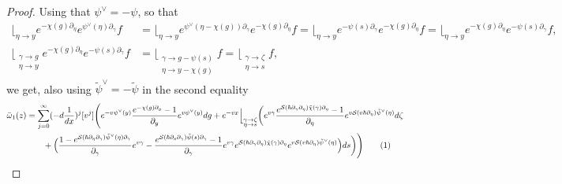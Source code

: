 \documentclass[10pt,a4paper,oneside,no-math,reqno]{amsart}%
\theoremstyle{plain}
\theoremstyle{definition}
\theoremstyle{remark}
\numberwithin{equation}{section}
\newcommand{\mc}[1]{\mathcal{#1}}
\newcommand{\1}{\mathds{1}}
\newcommand{\<}{\langle}
\renewcommand{\>}{\rangle}
\newcommand{\del}{\partial}
\begin{document}
\begin{proof}
	Using that $ \psi^\vee = -\psi$, so that
	\begin{align*}
		\Big\lfloor_{\eta \to y} e^{-\chi(g) \del_\eta} e^{ \psi^\vee (\eta) \del_\gamma} f
		&=
		\Big\lfloor_{\eta \to y} e^{\psi^\vee (\eta- \chi(g)) \del_\gamma} e^{-\chi(g)\del_\eta} f
		=
		\Big\lfloor_{\eta \to y} e^{- \psi (s) \del_\gamma} e^{-\chi(g)\del_\eta} f
		=
		\Big\lfloor_{\eta \to y} e^{-\chi(g)\del_\eta} e^{- \psi (s) \del_\gamma} f,
		\\
		\Big\lfloor_{\substack{\gamma \to g\\ \eta \to y}} e^{-\chi(g)\del_\eta} e^{- \psi (s) \del_\gamma} f
		&=
		\Big\lfloor_{\substack{\gamma \to g - \psi(s) \\ \eta \to y - \chi(g)}} f
		=
		\Big\lfloor_{\substack{\gamma \to \zeta \\ \eta \to s}} f,
	\end{align*}
	we get, also using $ \tilde{\psi}^\vee = - \tilde{\psi}$ in the second equality
	\begin{align*}
		\bar{\omega}_1 (z)
        &=
        \sum_{j=0}^\infty (-d \frac{1}{dx})^j [v^j ] 
		\Bigg( 
        e^{-v \psi^\vee (y)}  \frac{e^{-\chi (g) \del_y} - 1}{\del_y} e^{v \psi^\vee (y )} dg 
        + 
        e^{-vx}
        \Big\lfloor_{\substack{\gamma \to \zeta \\ \eta \to s}} \bigg( 
        e^{v\gamma} \frac{e^{ \mc{S}( \hbar \del_\gamma \del_\eta) \tilde{\chi} (\gamma) \del_\eta} - 1}{\del_\eta} e^{v \mc{S}(v\hbar \del_{\eta}) \tilde{\psi}^\vee(\eta) } d\zeta
        \\
		& \qquad
		+
		\Big(
		\frac{ 1 - e^{ \mc{S}(\hbar \del_{\eta} \del_\gamma) \tilde{\psi}^\vee(\eta) \del_\gamma} }{\del_\gamma} e^{v\gamma}
        - 
        \frac{e^{ \mc{S}(\hbar \del_s \del_\gamma) \tilde{\psi}(s) \del_\gamma} - 1}{\del_\gamma} e^{v\gamma} e^{ \mc{S}(\hbar \del_\gamma \del_\eta) \tilde{\chi}(\gamma) \del_\eta }
		e^{v \mc{S}(v\hbar \del_{\eta}) \tilde{\psi}^\vee(\eta) }
        \Big)
 		ds \bigg) \Bigg) 
 		\tag{\stepcounter{equation}\theequation}
        \\

\end{align*}
\end{proof}
\end{document}
